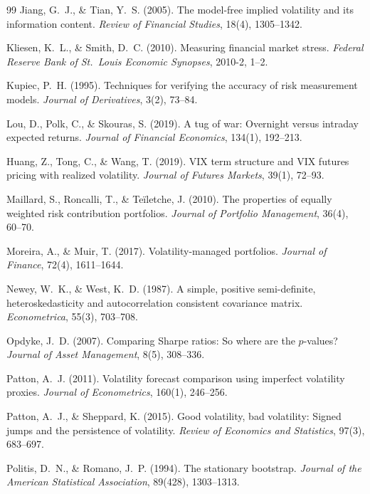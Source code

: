 \documentclass[12pt,a4paper]{article}
\begin{document}
\begin{thebibliography}{99}
Jiang, G.~J., \& Tian, Y.~S. (2005). The model-free implied volatility and its information content. \textit{Review of Financial Studies}, 18(4), 1305--1342.

Kliesen, K.~L., \& Smith, D.~C. (2010). Measuring financial market stress. \textit{Federal Reserve Bank of St.\ Louis Economic Synopses}, 2010-2, 1--2.

Kupiec, P.~H. (1995). Techniques for verifying the accuracy of risk measurement models. \textit{Journal of Derivatives}, 3(2), 73--84.

Lou, D., Polk, C., \& Skouras, S. (2019). A tug of war: Overnight versus intraday expected returns. \textit{Journal of Financial Economics}, 134(1), 192--213.

Huang, Z., Tong, C., \& Wang, T. (2019). VIX term structure and VIX futures pricing with realized volatility. \textit{Journal of Futures Markets}, 39(1), 72--93.

Maillard, S., Roncalli, T., \& Te\"{i}letche, J. (2010). The properties of equally weighted risk contribution portfolios. \textit{Journal of Portfolio Management}, 36(4), 60--70.

Moreira, A., \& Muir, T. (2017). Volatility-managed portfolios. \textit{Journal of Finance}, 72(4), 1611--1644.

Newey, W.~K., \& West, K.~D. (1987). A simple, positive semi-definite, heteroskedasticity and autocorrelation consistent covariance matrix. \textit{Econometrica}, 55(3), 703--708.

Opdyke, J.~D. (2007). Comparing Sharpe ratios: So where are the $p$-values? \textit{Journal of Asset Management}, 8(5), 308--336.

Patton, A.~J. (2011). Volatility forecast comparison using imperfect volatility proxies. \textit{Journal of Econometrics}, 160(1), 246--256.

Patton, A.~J., \& Sheppard, K. (2015). Good volatility, bad volatility: Signed jumps and the persistence of volatility. \textit{Review of Economics and Statistics}, 97(3), 683--697.

Politis, D.~N., \& Romano, J.~P. (1994). The stationary bootstrap. \textit{Journal of the American Statistical Association}, 89(428), 1303--1313.


\end{thebibliography}
\end{document}
